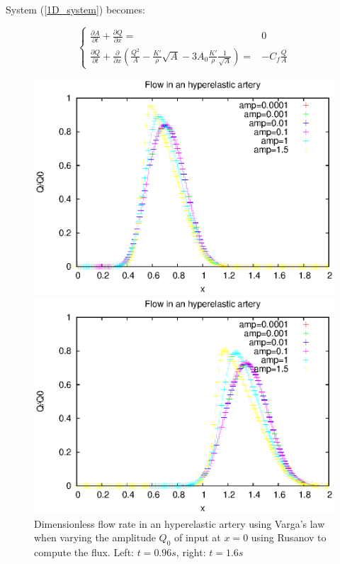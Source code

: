 \documentclass{config}
\begin{document}
System (\ref{1D_system}) becomes:

\begin{equation}\left\{
\begin{array}{rl}
\displaystyle \frac{\partial A}{\partial t} + \frac{\partial Q}{\partial x} = & \displaystyle  0 \\ 
\displaystyle \frac{\partial Q}{\partial t} + \frac{\partial }{\partial x} \left( \frac{Q^2}{A} - \frac{K'}{\rho} \sqrt{A} - 3 A_0 \frac{K'}{\rho} \frac{1}{\sqrt{A}} \right) = & \displaystyle - C_f \frac{Q}{A} 
\end{array}\right.
\end{equation}

\begin{figure}[H]
   \begin{minipage}[c]{.46\linewidth}
     \includegraphics[scale=0.7]{figures/Q_vargat1.eps}
   \end{minipage} \hfill
   \begin{minipage}[c]{.46\linewidth}
\includegraphics[scale=0.7]{figures/Q_vargat2.eps}
   \end{minipage}
   \caption{Dimensionless flow rate in an hyperelastic artery using Varga's law when varying the amplitude $Q_0$ of input at $x=0$ using Rusanov to compute the flux. Left: $t=0.96 s$, right: $t=1.6s$}
   \label{Q_varga}
\end{figure}
\end{document}
